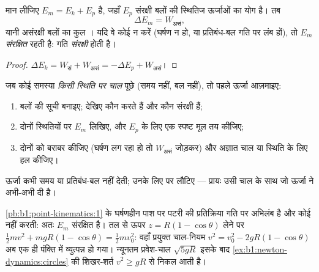 \begin{theorem}[यांत्रिक ऊर्जा]\label{thm:b1:work-and-energy:em}
मान लीजिए $E_m = E_k + E_p$ \emph{} है, जहाँ $E_p$ संरक्षी
बलों की स्थितिज ऊर्जाओं का योग है। तब
\[
\Delta E_m = W_{\text{असं}} ,
\]
यानी असंरक्षी बलों का कुल । यदि वे कोई  न करें (घर्षण न हो, या
प्रतिबंध-बल गति पर लंब हों), तो $E_m$ \emph{संरक्षित} रहती है: गति
\emph{संरक्षी} होती है।
\end{theorem}

\begin{proof}
$\Delta E_k = W_{\text{सं}} + W_{\text{असं}} = -\Delta E_p + W_{\text{असं}}$।
\end{proof}

\begin{method}[ऊर्जा का प्रयोग]\label{met:b1:work-and-energy:method}
जब कोई समस्या \emph{किसी स्थिति पर चाल} पूछे (समय नहीं, बल नहीं), तो पहले
ऊर्जा आज़माइए:
\begin{enumerate}
  \item बलों की सूची बनाइए; देखिए कौन  करते हैं और कौन संरक्षी हैं;
  \item दोनों स्थितियों पर $E_m$ लिखिए, और $E_p$ के लिए एक स्पष्ट मूल तय
        कीजिए;
  \item दोनों को बराबर कीजिए (घर्षण लग रहा हो तो $W_{\text{असं}}$ जोड़कर)
        और अज्ञात चाल या स्थिति के लिए हल कीजिए।
\end{enumerate}
ऊर्जा कभी समय या प्रतिबंध-बल नहीं देती; उनके लिए  पर लौटिए
--- प्रायः उसी चाल के साथ जो ऊर्जा ने अभी-अभी दी है।
\end{method}

\begin{example}[पाश का चाल-नियम]\label{ex:b1:work-and-energy:loop}
\cref{pb:b1:point-kinematics:1} के घर्षणहीन पाश पर पटरी की प्रतिक्रिया गति
पर अभिलंब है और कोई  नहीं करती: अतः $E_m$ संरक्षित है। तल से ऊपर
$z = R(1 - \cos\theta)$ लेने पर $\tfrac12 mv^2 + mgR(1 -
\cos\theta) = \tfrac12 mv_0^2$: वहाँ प्रयुक्त चाल-नियम $v^2 = v_0^2 - 2gR(1 -
\cos\theta)$ अब एक ही पंक्ति में व्युत्पन्न हो गया। न्यूनतम प्रवेश-चाल
$\sqrt{5gR}$ इसके बाद \cref{ex:b1:newton-dynamics:circles} की शिखर-शर्त
$v^2 \geq gR$ से निकल आती है।
\end{example}

